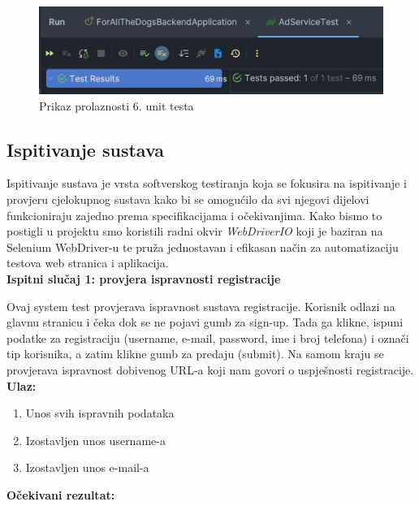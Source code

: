 		\begin{figure}[H]
			\includegraphics[scale=0.45]{slike/1unitrez.PNG} 
			\centering
			\caption{Prikaz prolaznosti 6. unit testa}
			\label{1unitrez}
		\end{figure}
		
\eject
	
			\subsection{Ispitivanje sustava}
			
			Ispitivanje sustava je vrsta softverskog testiranja koja se fokusira na ispitivanje i provjeru cjelokupnog sustava kako bi se omogućilo da svi njegovi dijelovi funkcioniraju zajedno prema specifikacijama i očekivanjima. Kako bismo to postigli u projektu smo koristili radni okvir \textit{WebDriverIO} koji je baziran na Selenium WebDriver-u  te pruža jednostavan i efikasan način za automatizaciju testova web stranica i aplikacija.\\
			
			\textbf{Ispitni slučaj 1: provjera ispravnosti registracije}
			
			Ovaj system test provjerava ispravnost sustava registracije. Korisnik odlazi na glavnu stranicu i čeka dok se ne pojavi gumb za sign-up. Tada ga klikne, ispuni podatke za registraciju (username, e-mail, password, ime i broj telefona) i označi tip korisnika, a zatim klikne gumb za predaju (submit). Na samom kraju se provjerava ispravnost dobivenog URL-a koji nam govori o uspješnosti registracije.\\
			
			\textbf{Ulaz:}

				\begin{enumerate}
					\item Unos svih ispravnih podataka
					\item Izostavljen unos username-a
					\item Izostavljen unos e-mail-a
				\end{enumerate}
				
			\textbf{Očekivani rezultat:}
			
